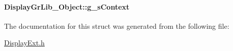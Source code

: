 \paragraph[{g\+\_\+s\+Context}]{ Display\+Gr\+Lib\+\_\+\+Object\+::g\+\_\+s\+Context}\label{struct_display_gr_lib___object_a26d29c5097a4edbf1d6fa8f2907c04e4}


The documentation for this struct was generated from the following file\+:\begin{DoxyCompactItemize}
\item 
\hyperlink{_display_ext_8h}{Display\+Ext.\+h}\end{DoxyCompactItemize}
